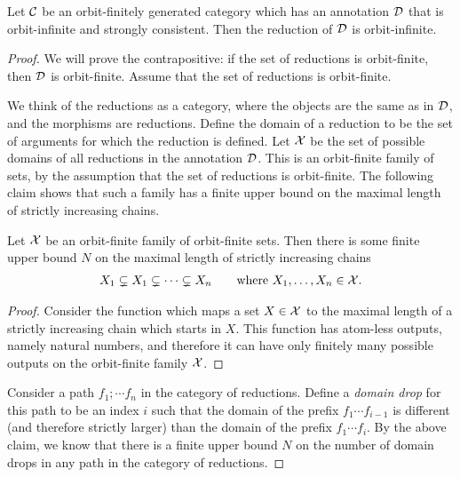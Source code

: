 \begin{lemma}\label{lem:reductions-orbit-infinite}
    Let ${\mathcal C}$ be an orbit-finitely generated category which has an annotation ${\mathcal D}$ that is orbit-infinite and strongly consistent. Then the reduction of ${\mathcal D}$  is orbit-infinite. 
\end{lemma}
\begin{proof}
    We will prove the contrapositive: if the set of reductions is orbit-finite, then ${\mathcal D}$ is orbit-finite. Assume that the set of reductions is orbit-finite. 

    We think of the reductions as a category, where the objects are the same as in ${\mathcal D}$, and the morphisms are reductions.
    Define the domain of a reduction to be the set of arguments for which the reduction is defined. Let $\mathcal X$ be the set of possible domains of all reductions in the annotation ${\mathcal D}$. This is an orbit-finite family of sets, by the assumption that the set of reductions is orbit-finite. The following claim shows that such a family has a finite upper bound on the maximal length of strictly increasing chains.


            \begin{claim}\label{claim:chains-bounded}
            Let $\mathcal X$ be an orbit-finite family of orbit-finite sets. Then there is some finite upper bound $N$ on the maximal length of strictly increasing chains
            \begin{align*}
            X_1 \subsetneq X_1 \subsetneq \cdots \subsetneq X_n 
            \qquad 
            \text{where $X_1,\ldots,X_n \in \mathcal X$.}
            \end{align*}
        \end{claim}
        \begin{proof}
            Consider the function which maps a set $X \in \mathcal X$ to the maximal length of a strictly increasing chain which starts in $X$. This function has atom-less outputs, namely natural numbers, and therefore it can have only finitely many possible outputs on the orbit-finite family $\mathcal X$. 
        \end{proof}

        Consider a path $f_1; \cdots f_n$ in the category of reductions. Define a \emph{domain drop} for this path to be an index $i$ such that the domain of the prefix $f_1 \cdots f_{i-1}$ is different (and therefore strictly larger) than the domain of the prefix $f_1 \cdots f_i$. By the above claim, we know that there is a finite upper bound $N$ on the number of domain drops in any path in the category of reductions.


\end{proof}
